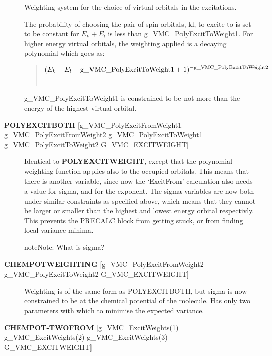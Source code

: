 \documentclass[openany,a4paper,10pt,english]{manual}
\begin{document}
\begin{description}
Weighting system for the choice of virtual orbitals in
the excitations.

The probability of choosing the pair of spin orbitals, kl, to excite
to is set to be constant for $E_k+E_l$ is less than
g\_VMC\_PolyExcitToWeight1.  For higher energy virtual orbitals,
the weighting applied is a decaying polynomial which goes as:
\begin{quote}
\begin{gather}
\begin{split}(E_k+E_l-\text{g\_VMC\_PolyExcitToWeight1}+1)^{-\text{g\_VMC\_PolyExcitToWeight2}}\end{split}\notag\\\begin{split}\end{split}\notag
\end{gather}\end{quote}

g\_VMC\_PolyExcitToWeight1 is constrained to be not more than the
energy of the highest virtual orbital.

\item[\textbf{POLYEXCITBOTH} {[}g\_VMC\_PolyExcitFromWeight1 g\_VMC\_PolyExcitFromWeight2 g\_VMC\_PolyExcitToWeight1 g\_VMC\_PolyExcitToWeight2 G\_VMC\_EXCITWEIGHT{]}] \leavevmode
Identical to \textbf{POLYEXCITWEIGHT}, except that the polynomial weighting
function applies also to the occupied orbitals.  This means that there
is another variable, since now the `ExcitFrom' calculation also needs
a value for sigma, and for the exponent.  The sigma variables are
now both under similar constraints as specified above, which means
that they cannot be larger or smaller than the highest and lowest
energy orbital respectivly.  This prevents the PRECALC block from
getting stuck, or from finding local variance minima.

\begin{notice}{note}{Note:}
What is sigma?
\end{notice}

\item[\textbf{CHEMPOTWEIGHTING} {[}g\_VMC\_PolyExcitFromWeight2 g\_VMC\_PolyExcitToWeight2 G\_VMC\_EXCITWEIGHT{]}] \leavevmode
Weighting is of the same form as POLYEXCITBOTH, but sigma is
now constrained to be at the chemical potential of the molecule.
Has only two parameters with which to minimise the expected variance.

\item[\textbf{CHEMPOT-TWOFROM} {[}g\_VMC\_ExcitWeights(1) g\_VMC\_ExcitWeights(2) g\_VMC\_ExcitWeights(3) G\_VMC\_EXCITWEIGHT{]}] \leavevmode\begin{quote}


\end{quote}
\end{description}
\end{document}
